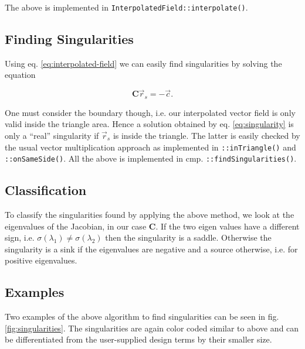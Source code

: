 \documentclass[a4paper,10pt,notitlepage]{scrreprt}
\newcommand{\mat}[1]{\mathbf{#1}}
\begin{document}
The above is implemented in \texttt{InterpolatedField::interpolate()}.

\subsection{Finding Singularities}

Using eq. \ref{eq:interpolated-field} we can easily find singularities by
solving the equation

\begin{equation}
 \mat{C} \vec{r}_s = - \vec{c}.
 \label{eq:singularity}
\end{equation}

One must consider the boundary though, i.e. our interpolated vector field is
only valid inside the triangle area. Hence a solution obtained by
eq. \ref{eq:singularity} is only a ``real'' singularity if $\vec{r}_s$ is
inside the triangle. The latter is easily checked by the usual vector
multiplication approach as implemented in \texttt{::inTriangle()} and
\texttt{::onSameSide()}. All the above is implemented in cmp.
\texttt{::findSingularities()}.

\subsection{Classification}

To classify the singularities found by applying the above method, we look at
the eigenvalues of the Jacobian, in our case $\mat{C}$. If the two eigen values
have a different sign, i.e. $\sigma(\lambda_1) \neq \sigma(\lambda_2)$ then the
singularity is a saddle. Otherwise the singularity is a sink if the eigenvalues
are negative and a source otherwise, i.e. for positive eigenvalues.

\subsection{Examples}

Two examples of the above algorithm to find singularities can be seen in fig.
\ref{fig:singularities}. The singularities are again color coded similar to
above and can be differentiated from the user-supplied design terms by their
smaller size.
\end{document}
